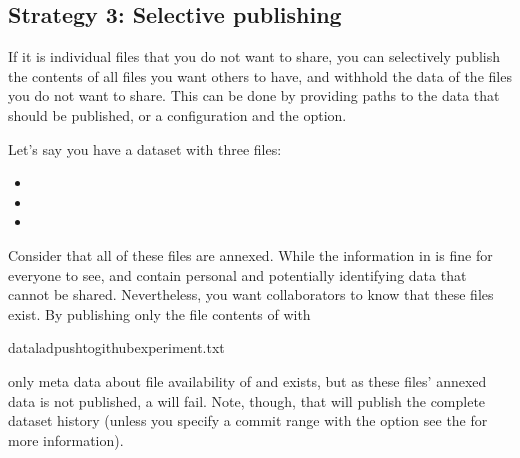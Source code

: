 \subsection{Strategy 3: Selective publishing}
\label{\detokenize{basics/101-139-privacy:strategy-3-selective-publishing}}
\sphinxAtStartPar
If it is individual files that you do not want to share, you can selectively publish the contents of all files you want others to have, and withhold the data of the files you do not want to share.
This can be done by providing paths to the data that should be published, or a  configuration and the  option.

\sphinxAtStartPar
Let’s say you have a dataset with three files:
\begin{itemize}
\item {} 
\sphinxAtStartPar
{}

\item {} 
\sphinxAtStartPar
{}

\item {} 
\sphinxAtStartPar
{}

\end{itemize}

\sphinxAtStartPar
Consider that all of these files are annexed. While the information in  is fine for everyone to see,  and  contain personal and potentially identifying data that cannot be shared.
Nevertheless, you want collaborators to know that these files exist.
By publishing only the file contents of  with

\begin{sphinxVerbatim}[commandchars=\\\{\}]
dataladpush\PYGZhy{}\PYGZhy{}togithubexperiment.txt
\end{sphinxVerbatim}

\sphinxAtStartPar
only meta data about file availability of  and  exists, but as these files’ annexed data is not published, a 
will fail.
Note, though, that  will publish the complete dataset history (unless you specify a commit range with the  option \textendash{} see the  for more information).

